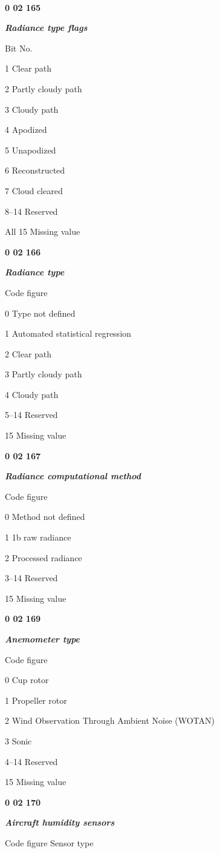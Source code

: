\textbf{\\
}

\textbf{0 02 165}

\emph{\textbf{Radiance type flags}}

Bit No.

1 Clear path

2 Partly cloudy path

3 Cloudy path

4 Apodized

5 Unapodized

6 Reconstructed

7 Cloud cleared

8--14 Reserved

All 15 Missing value

\textbf{0 02 166}

\emph{\textbf{Radiance type}}

Code figure

0 Type not defined

1 Automated statistical regression

2 Clear path

3 Partly cloudy path

4 Cloudy path

5--14 Reserved

15 Missing value

\textbf{0 02 167}

\emph{\textbf{Radiance computational method}}

Code figure

0 Method not defined

1 1b raw radiance

2 Processed radiance

3--14 Reserved

15 Missing value

\textbf{0 02 169}

\emph{\textbf{Anemometer type}}

Code figure

0 Cup rotor

1 Propeller rotor

2 Wind Observation Through Ambient Noise (WOTAN)

3 Sonic

4--14 Reserved

15 Missing value

\textbf{0 02 170}

\emph{\textbf{Aircraft humidity sensors}}

Code figure Sensor type

